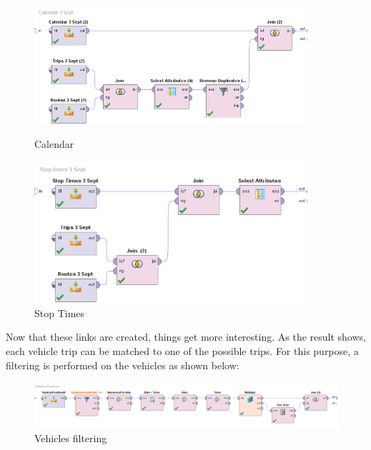\documentclass{article}
\begin{document}
\begin{figure}[H]
    \centering
    \begin{minipage}{0.5\textwidth}
        \centering
        \includegraphics[width=0.9\textwidth]{images/Superset Calendar.png}
        \caption{Calendar}
    \end{minipage}\hfill
    \begin{minipage}{0.5\textwidth}
        \centering
        \includegraphics[width=0.9\textwidth]{images/Stops Times Superset.png} 
        \caption{Stop Times}
    \end{minipage}
\end{figure}

Now that these links are created, things get more interesting. As the result shows, each vehicle trip can be matched to one of the possible trips. For this purpose, a filtering is performed on the vehicles as shown below:

\begin{figure}[H]
    \centering
    \includegraphics[width=\textwidth]{images/Vehicles Filter.png} 
    \caption{Vehicles filtering}
\end{figure}
\end{document}
